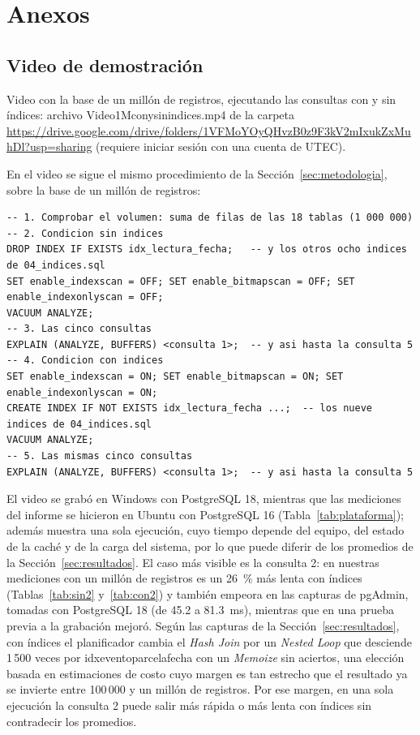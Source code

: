 \documentclass[11pt,letterpaper]{article}
\newcommand{\enlaceVideo}{\url{https://drive.google.com/drive/folders/1VFMoYOyQHvzB0z9F3kV2mIxukZxMuhDl?usp=sharing}}
\newcommand{\tbus}{\textunderscore\allowbreak}
\newcommand{\tb}[1]{{\ttfamily\let\_\tbus #1}}
\begin{document}
\section{Anexos}

\subsection{Video de demostración}

Video con la base de un millón de registros, ejecutando las consultas con y sin índices: archivo \tb{Video\_1M\_con\_y\_sin\_indices.mp4} de la carpeta \enlaceVideo{} (requiere iniciar sesión con una cuenta de UTEC).

En el video se sigue el mismo procedimiento de la Sección~\ref{sec:metodologia}, sobre la base de un millón de registros:

\begin{lstlisting}
-- 1. Comprobar el volumen: suma de filas de las 18 tablas (1 000 000)
-- 2. Condicion sin indices
DROP INDEX IF EXISTS idx_lectura_fecha;   -- y los otros ocho indices de 04_indices.sql
SET enable_indexscan = OFF; SET enable_bitmapscan = OFF; SET enable_indexonlyscan = OFF;
VACUUM ANALYZE;
-- 3. Las cinco consultas
EXPLAIN (ANALYZE, BUFFERS) <consulta 1>;  -- y asi hasta la consulta 5
-- 4. Condicion con indices
SET enable_indexscan = ON; SET enable_bitmapscan = ON; SET enable_indexonlyscan = ON;
CREATE INDEX IF NOT EXISTS idx_lectura_fecha ...;  -- los nueve indices de 04_indices.sql
VACUUM ANALYZE;
-- 5. Las mismas cinco consultas
EXPLAIN (ANALYZE, BUFFERS) <consulta 1>;  -- y asi hasta la consulta 5
\end{lstlisting}

El video se grabó en Windows con PostgreSQL 18, mientras que las mediciones del informe se hicieron en Ubuntu con PostgreSQL 16 (Tabla~\ref{tab:plataforma}); además muestra una sola ejecución, cuyo tiempo depende del equipo, del estado de la caché y de la carga del sistema, por lo que puede diferir de los promedios de la Sección~\ref{sec:resultados}. El caso más visible es la consulta 2: en nuestras mediciones con un millón de registros es un 26~\% más lenta con índices (Tablas~\ref{tab:sin2} y~\ref{tab:con2}) y también empeora en las capturas de pgAdmin, tomadas con PostgreSQL 18 (de 45.2 a 81.3~ms), mientras que en una prueba previa a la grabación mejoró. Según las capturas de la Sección~\ref{sec:resultados}, con índices el planificador cambia el \emph{Hash Join} por un \emph{Nested Loop} que desciende 1\,500 veces por \tb{idx\_evento\_parcela\_fecha} con un \emph{Memoize} sin aciertos, una elección basada en estimaciones de costo cuyo margen es tan estrecho que el resultado ya se invierte entre 100\,000 y un millón de registros. Por ese margen, en una sola ejecución la consulta 2 puede salir más rápida o más lenta con índices sin contradecir los promedios.
\end{document}
